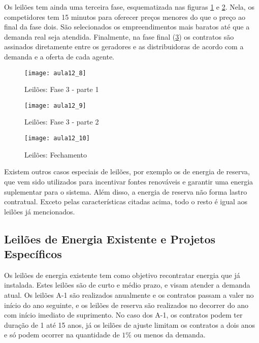 Os leilões tem ainda uma terceira fase, esquematizada nas figuras \ref{fig:aula12_8} e \ref{fig:aula12_9}. Nela, os competidores tem 15 minutos para oferecer preços menores do que o preço ao final da fase dois. São selecionados os empreendimentos mais baratos até que a demanda real seja atendida. Finalmente, na fase final (\ref{fig:aula12_10}) os contratos são assinados diretamente entre os geradores e as distribuidoras de acordo com a demanda e a oferta de cada agente. 

\begin{figure}[H]
\begin{centering}
\texttt{[image: aula12\_8]}\protect\caption{\label{fig:aula12_8} Leilões: Fase 3 - parte 1}
\end{centering}
\end{figure}

\begin{figure}[H]
\begin{centering}
\texttt{[image: aula12\_9]}\protect\caption{\label{fig:aula12_9} Leilões: Fase 3 - parte 2}
\end{centering}
\end{figure}


\begin{figure}[H]
\begin{centering}
\texttt{[image: aula12\_10]}\protect\caption{\label{fig:aula12_10} Leilões: Fechamento}
\end{centering}
\end{figure}

Existem outros casos especiais de leilões, por exemplo os de energia de reserva, que vem sido utilizados para incentivar fontes renováveis e garantir uma energia suplementar para o sistema. Além disso, a energia de reserva não forma lastro contratual. Exceto pelas características citadas acima, todo o resto é igual aos leilões já mencionados. 

\subsection{Leilões de Energia Existente e Projetos Específicos}

Os leilões de energia existente tem como objetivo recontratar energia que já instalada. Estes leilões são de curto e médio prazo, e visam atender a demanda atual. Os leilões A-1 são realizados anualmente e os contratos passam a valer no início do ano seguinte, e os leilões de reserva são realizados no decorrer do ano com início imediato de suprimento. No caso dos A-1, os contratos podem ter duração de 1 até 15 anos, já os leilões de ajuste limitam os contratos a dois anos e só podem ocorrer na quantidade de $1\%$ ou menos da demanda. 

